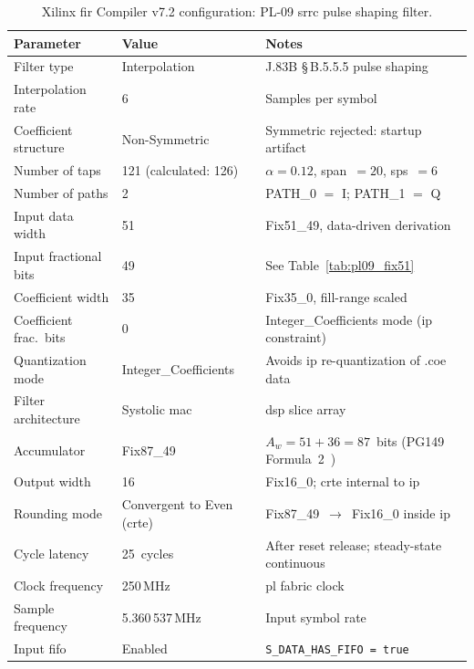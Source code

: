 \begin{table}[htbp]
  \caption{Xilinx \ac{fir} Compiler v7.2 configuration: PL-09
           \ac{srrc} pulse shaping filter.}
  \label{tab:pl09_config}
  \centering
  \small
  \begin{tabular}{lp{4.2cm}p{5.0cm}}
    \hline
    Parameter & Value & Notes \\
    \hline
    Filter type
      & Interpolation
      & J.83B \S\,B.5.5.5 pulse shaping \\[2pt]
    Interpolation rate
      & 6
      & Samples per symbol \\[2pt]
    Coefficient structure
      & Non-Symmetric
      & Symmetric rejected: startup artifact \\[2pt]
    Number of taps
      & 121 (calculated: 126)
      & $\alpha = 0.12$, span~$= 20$, sps~$= 6$ \\[2pt]
    Number of paths
      & 2
      & PATH\_0 $=$ I; PATH\_1 $=$ Q \\[2pt]
    Input data width
      & 51
      & Fix51\_49, data-driven derivation \\[2pt]
    Input fractional bits
      & 49
      & See Table~\ref{tab:pl09_fix51} \\[2pt]
    Coefficient width
      & 35
      & Fix35\_0, fill-range scaled \\[2pt]
    Coefficient frac.\ bits
      & 0
      & Integer\_Coefficients mode (\ac{ip} constraint) \\[2pt]
    Quantization mode
      & Integer\_Coefficients
      & Avoids \ac{ip} re-quantization of .coe data \\[2pt]
    Filter architecture
      & Systolic \ac{mac}
      & \ac{dsp} slice array \\[2pt]
    Accumulator
      & Fix87\_49
      & $A_w = 51 + 36 = 87$~bits (PG149 Formula~2~\cite{AMD_PG149}) \\[2pt]
    Output width
      & 16
      & Fix16\_0; \ac{crte} internal to \ac{ip} \\[2pt]
    Rounding mode
      & Convergent to Even (\ac{crte})
      & Fix87\_49~$\to$~Fix16\_0 inside \ac{ip} \\[2pt]
    Cycle latency
      & 25~cycles
      & After reset release; steady-state continuous \\[2pt]
    Clock frequency
      & 250\,MHz
      & \ac{pl} fabric clock \\[2pt]
    Sample frequency
      & 5.360\,537\,MHz
      & Input symbol rate \\[2pt]
    Input \ac{fifo}
      & Enabled
      & \texttt{S\_DATA\_HAS\_FIFO = true} \\
    \hline
  \end{tabular}
\end{table}

